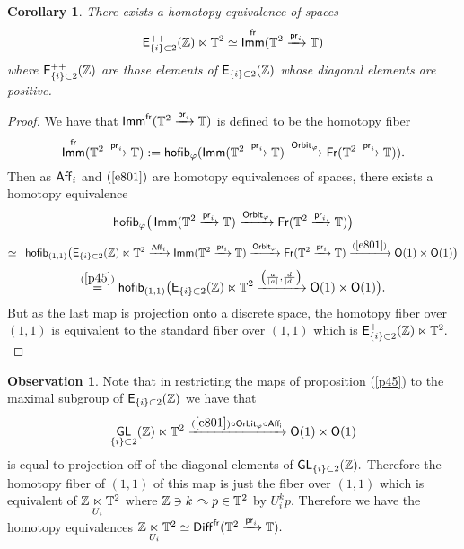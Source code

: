 \documentclass{amsart}
\newtheorem{cor}[theorem]{Corollary}
\theoremstyle{definition}
\newtheorem{observation}[theorem]{Observation}
\theoremstyle{remark}
\DeclareMathOperator{\pr}{\mathsf{pr}}
\newcommand{\lacts}{\curvearrowright}
\DeclareMathOperator{\Diff}{{\sf Diff}}
\DeclareMathOperator{\fr}{\sf fr}
\newcommand{\xra}{\xrightarrow}
\DeclareMathOperator{\GL}{\sf GL}
\DeclareMathOperator{\Fr}{\sf Fr}
\DeclareMathOperator{\Imm}{\sf Imm}
\begin{document}
\begin{cor}
There exists a homotopy equivalence of spaces 
\[
{\sf E}_{\{i\} \subset 2}^{++}(\ZZ) \ltimes \TT^{2} \simeq \Imm^{\sf fr}(\TT^2 \xra{\pr_i} \TT) 
\]
where ${\sf E}_{\{i\} \subset 2}^{++}(\mathbb Z)$ are those elements of ${\sf E}_{\{i\} \subset 2}(\mathbb Z)$ whose diagonal elements are positive.
\end{cor}
 \begin{proof}
 We have that $\Imm^{\sf fr}(\TT^2 \xra{\pr_i} \TT)$ is defined to be the homotopy fiber
 \[
\Imm^{\sf fr}(\TT^2 \xra{\pr_i} \TT) := {\sf hofib}_{\varphi}(\Imm(\TT^2 \xra{\pr_i} \TT) \xra{{\sf Orbit}_{\varphi}} \Fr(\TT^2 \xra{\pr_i} \TT)).
\]
Then as ${\sf Aff}_{i}$ and $(\ref{e801})$ are homotopy equivalences of spaces, there exists a homotopy equivalence 
\[
{\sf hofib}_{\varphi}\big(\Imm(\TT^2 \xra{\pr_i} \TT) \xra{{\sf Orbit}_{\varphi}} \Fr(\TT^2 \xra{\pr_i} \TT)\big) 
\] 
\[
\simeq \hspace{5pt} {\sf hofib}_{(1,1)}\big({\sf E}_{\{i\} \subset 2}(\ZZ) \ltimes \TT^{2} \xra{{\sf Aff}_{i}} \Imm(\TT^2 \xra{\pr_i} \TT) \xra{{\sf Orbit}_{\varphi}} \Fr(\TT^2 \xra{\pr_i} \TT) \xra{(\ref{e801})} {\sf O}(1) \times {\sf O}(1)\big) 
\]
\[
\overset{(\ref{p45})}= {\sf hofib}_{(1,1)}\big({\sf E}_{\{i\} \subset 2}(\ZZ) \ltimes \TT^{2} \xra{\left(\frac{a}{|a|}, \frac{d}{|d|}\right)} {\sf O}(1) \times {\sf O}(1)\big).
\]
But as the last map is projection onto a discrete space, the homotopy fiber over $(1, 1)$ is equivalent to the standard fiber over $(1, 1)$ which is ${\sf E}_{\{i\} \subset 2}^{++}(\mathbb Z) \ltimes \mathbb T^{2}.$
\end{proof}
 
 
 \begin{observation} \label{t14}
Note that in restricting the maps of proposition (\ref{p45}) to the maximal subgroup of ${\sf E}_{\{i\} \subset 2}(\mathbb Z)$ we have that $$\GL_{\{i\} \subset 2}(\ZZ) \ltimes \TT^{2} \xra{(\ref{e801}) \circ {\sf Orbit}_{\varphi} \circ {\sf Aff_{i}}} {\sf O}(1) \times {\sf O}(1)$$ is equal to projection off of the diagonal elements of $\GL_{\{i\} \subset 2}(\ZZ).$ Therefore the homotopy fiber of $(1, 1)$ of this map is just the fiber over $(1, 1)$ which is equivalent of $\mathbb Z \underset{U_{i}}\ltimes \mathbb T^{2}$ where $\ZZ \ni k \lacts p \in \TT^{2}$ by $U_{i}^{k}p.$ Therefore we have the homotopy equivalences $\ZZ \underset{U_{i}}\ltimes \TT^{2} \simeq \Diff^{\fr}(\TT^2 \xra{\pr_i} \TT).$
\end{observation}
 
\end{document}
